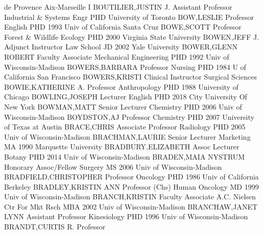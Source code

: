 \documentclass[
]{article}
\begin{document}
de Provence Aix-Marseille I \textbar BOUTILIER,JUSTIN J.
\textbar Assistant Professor \textbar{}  \textbar Industrial
\& Systems Engr \textbar PHD University of Toronto \textbar BOW,LESLIE
\textbar Professor \textbar{}  \textbar English \textbar PHD
1993 Univ of California Santa Cruz \textbar BOWE,SCOTT
\textbar Professor \textbar{}  \textbar Forest \& Wildlife
Ecology \textbar PHD 2000 Virginia State University \textbar BOWEN,JEFF
J. \textbar Adjunct Instructor \textbar{}  \textbar Law
School \textbar JD 2002 Yale University \textbar BOWER,GLENN ROBERT
\textbar Faculty Associate \textbar{}  \textbar Mechanical
Engineering \textbar PHD 1992 Univ of Wisconsin-Madison
\textbar BOWERS,BARBARA \textbar Professor \textbar{} 
\textbar Nursing \textbar PHD 1984 U of California San Francisco
\textbar BOWERS,KRISTI \textbar Clinical Instructor \textbar{}
 \textbar Surgical Sciences \textbar BOWIE,KATHERINE A.
\textbar Professor \textbar Anthropology \textbar{} 
\textbar PHD 1988 University of Chicago \textbar BOWLING,JOSEPH
\textbar Lecturer \textbar English \textbar{}  \textbar PHD
2018 City University Of New York \textbar BOWMAN,MATT \textbar Senior
Lecturer \textbar Chemistry \textbar{}  \textbar PHD 2006
Univ of Wisconsin-Madison \textbar BOYDSTON,AJ \textbar Professor
\textbar Chemistry \textbar{}  \textbar PHD 2007 University
of Texas at Austin \textbar BRACE,CHRIS \textbar Associate Professor
\textbar Radiology \textbar{}  \textbar PHD 2005 Univ of
Wisconsin-Madison \textbar BRACHMAN,LAURIE \textbar Senior Lecturer
\textbar Marketing \textbar{}  \textbar MA 1990 Marquette
University \textbar BRADBURY,ELIZABETH \textbar Assoc Lecturer
\textbar Botany \textbar{}  \textbar PHD 2014 Univ of
Wisconsin-Madison \textbar BRADEN,MAIA NYSTRUM \textbar Honorary
Assoc/Fellow \textbar Surgery \textbar{}  \textbar MS 2006
Univ of Wisconsin-Madison \textbar BRADFIELD,CHRISTOPHER
\textbar Professor \textbar Oncology \textbar{}  \textbar PHD
1986 Univ of California Berkeley \textbar BRADLEY,KRISTIN ANN
\textbar Professor (Chs) \textbar Human Oncology \textbar{} 
\textbar MD 1999 Univ of Wisconsin-Madison \textbar BRANCH,KRISTIN
\textbar Faculty Associate \textbar A.C. Nielsen Ctr For Mkt Rsch
\textbar{}  \textbar MBA 2002 Univ of Wisconsin-Madison
\textbar BRANCHAW,JANET LYNN \textbar Assistant Professor
\textbar Kinesiology \textbar{}  \textbar PHD 1996 Univ of
Wisconsin-Madison \textbar BRANDT,CURTIS R. \textbar Professor
\end{document}

